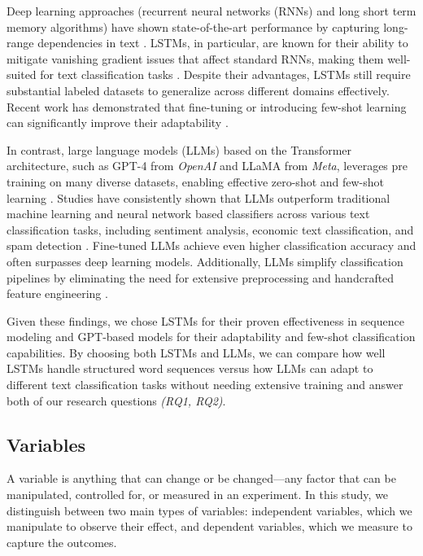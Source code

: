 Deep learning approaches (recurrent neural networks (RNNs) and long short term memory algorithms) have shown state-of-the-art performance by capturing long-range dependencies in text \cite{sutskever2014sequence}. LSTMs, in particular, are known for their ability to mitigate vanishing gradient issues that affect standard RNNs, making them well-suited for text classification tasks \cite{hochreiter1997long}. Despite their advantages, LSTMs still require substantial labeled datasets to generalize across different domains effectively. Recent work has demonstrated that fine-tuning or introducing few-shot learning can significantly improve their adaptability \cite{jamshidi2024effective}.

In contrast, large language models (LLMs) based on the Transformer architecture, such as GPT-4 from \textit{OpenAI} and LLaMA from \textit{Meta}, leverages pre training on many diverse datasets, enabling effective zero-shot and few-shot learning \cite{brown2020language} \cite{touvron2023llama}. Studies have consistently shown that LLMs outperform traditional machine learning and neural network based classifiers across various text classification tasks, including sentiment analysis, economic text classification, and spam detection \cite{moller2024parrot,betianu2024dallmi}. Fine-tuned LLMs achieve even higher classification accuracy and often surpasses deep learning models. Additionally, LLMs simplify classification pipelines by eliminating the need for extensive preprocessing and handcrafted feature engineering \cite{oh2024language}.

Given these findings, we chose LSTMs for their proven effectiveness in sequence modeling and GPT-based models for their adaptability and few-shot classification capabilities. By choosing both LSTMs and LLMs, we can compare how well LSTMs handle structured word sequences versus how LLMs can adapt to different text classification tasks without needing extensive training and answer both of our research questions \textit{(RQ1, RQ2)}.

\subsection{Variables}
A variable is anything that can change or be changed—any factor that can be manipulated, controlled for, or measured in an experiment. In this study, we distinguish between two main types of variables: independent variables, which we manipulate to observe their effect, and dependent variables, which we measure to capture the outcomes.

